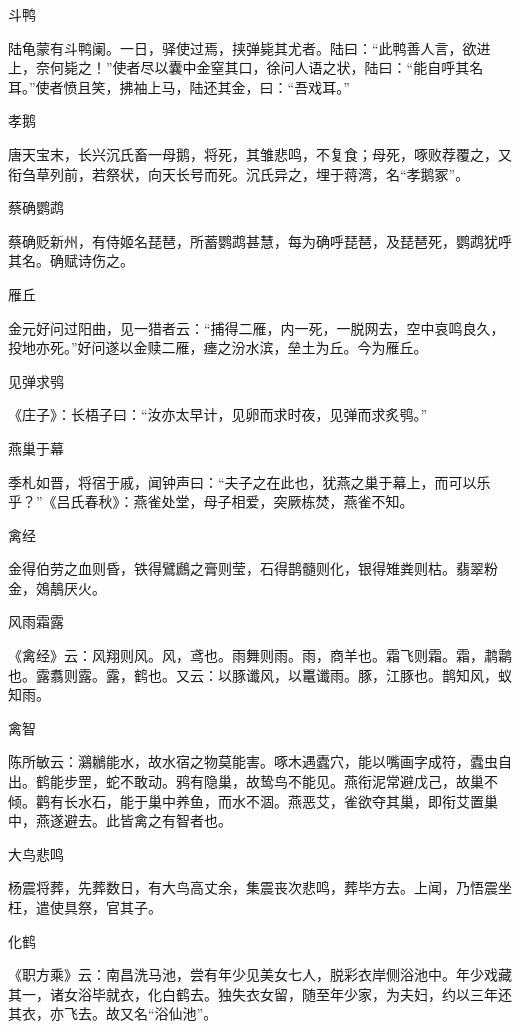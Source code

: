 \documentclass[a4paper,12pt,UTF8,twoside]{ctexbook}
\begin{document}
    斗鸭
    
    陆龟蒙有斗鸭阑。一日，驿使过焉，挟弹毙其尤者。陆曰：“此鸭善人言，欲进上，奈何毙之！”使者尽以囊中金窒其口，徐问人语之状，陆曰：“能自呼其名耳。”使者愤且笑，拂袖上马，陆还其金，曰：“吾戏耳。”
    
    孝鹅
    
    唐天宝末，长兴沉氏畜一母鹅，将死，其雏悲鸣，不复食；母死，啄败荐覆之，又衔刍草列前，若祭状，向天长号而死。沉氏异之，埋于蒋湾，名“孝鹅冢”。
    
    蔡确鹦鹉
    
    蔡确贬新州，有侍姬名琵琶，所蓄鹦鹉甚慧，每为确呼琵琶，及琵琶死，鹦鹉犹呼其名。确赋诗伤之。
    
    雁丘
    
    金元好问过阳曲，见一猎者云：“捕得二雁，内一死，一脱网去，空中哀鸣良久，投地亦死。”好问遂以金赎二雁，瘗之汾水滨，垒土为丘。今为雁丘。
    
    见弹求鸮
    
    《庄子》：长梧子曰：“汝亦太早计，见卵而求时夜，见弹而求炙鸮。”
    
    燕巢于幕
    
    季札如晋，将宿于戚，闻钟声曰：“夫子之在此也，犹燕之巢于幕上，而可以乐乎？”《吕氏春秋》：燕雀处堂，母子相爱，突厥栋焚，燕雀不知。
    
    禽经
    
    金得伯劳之血则昏，铁得鷿鷉之膏则莹，石得鹊髓则化，银得雉粪则枯。翡翠粉金，鵁鶄厌火。
    
    风雨霜露
    
    《禽经》云：风翔则风。风，鸢也。雨舞则雨。雨，商羊也。霜飞则霜。霜，鹔鹴也。露翥则露。露，鹤也。又云：以豚谶风，以鼍谶雨。豚，江豚也。鹊知风，蚁知雨。
    
    禽智
    
    陈所敏云：鸂鶒能水，故水宿之物莫能害。啄木遇蠹穴，能以嘴画字成符，蠹虫自出。鹤能步罡，蛇不敢动。鸦有隐巢，故鸷鸟不能见。燕衔泥常避戊己，故巢不倾。鹳有长水石，能于巢中养鱼，而水不涸。燕恶艾，雀欲夺其巢，即衔艾置巢中，燕遂避去。此皆禽之有智者也。
    
    大鸟悲鸣
    
    杨震将葬，先葬数日，有大鸟高丈余，集震丧次悲鸣，葬毕方去。上闻，乃悟震坐枉，遣使具祭，官其子。
    
    化鹤
    
    《职方乘》云：南昌洗马池，尝有年少见美女七人，脱彩衣岸侧浴池中。年少戏藏其一，诸女浴毕就衣，化白鹤去。独失衣女留，随至年少家，为夫妇，约以三年还其衣，亦飞去。故又名“浴仙池”。
    
\end{document}
